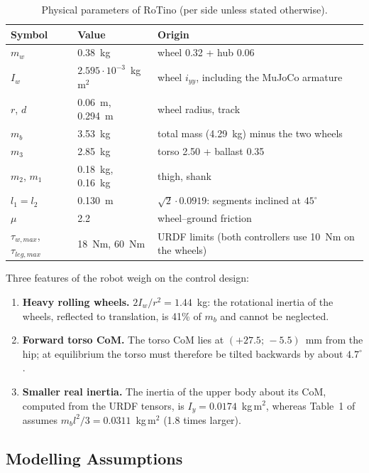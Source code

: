 \documentclass[11pt,a4paper]{article}
\newcommand{\dgr}{^{\circ}}
\begin{document}
\begin{table}[H]
    \centering
    \caption{Physical parameters of RoTino (per side unless stated otherwise).}
    \label{tab:params}
    \begin{tabular}{llp{6.3cm}}
        \toprule
        Symbol & Value & Origin \\
        \midrule
        $m_w$ & 0.38~kg & wheel 0.32 + hub 0.06 \\
        $I_w$ & $2.595\cdot10^{-3}$~kg\,m$^2$ & wheel $i_{yy}$, including the MuJoCo armature \\
        $r$, $d$ & 0.06~m, 0.294~m & wheel radius, track \\
        $m_b$ & 3.53~kg & total mass (4.29~kg) minus the two wheels \\
        $m_3$ & 2.85~kg & torso 2.50 + ballast 0.35 \\
        $m_2$, $m_1$ & 0.18~kg, 0.16~kg & thigh, shank \\
        $l_1 = l_2$ & 0.130~m & $\sqrt{2}\cdot 0.0919$: segments inclined at $45\dgr$ \\
        $\mu$ & 2.2 & wheel--ground friction \\
        $\tau_{w,max}$, $\tau_{leg,max}$ & 18~Nm, 60~Nm & URDF limits (both controllers use 10~Nm on the wheels) \\
        \bottomrule
    \end{tabular}
\end{table}

Three features of the robot weigh on the control design:
\begin{enumerate}[leftmargin=*]
    \item \textbf{Heavy rolling wheels.}  $2I_w/r^2 = 1.44$~kg: the rotational inertia of the
          wheels, reflected to translation, is 41\% of $m_b$ and cannot be neglected.
    \item \textbf{Forward torso CoM.}  The torso CoM lies at $(+27.5;\,-5.5)$~mm from the hip;
          at equilibrium the torso must therefore be tilted backwards by about $4.7\dgr$.
    \item \textbf{Smaller real inertia.}  The inertia of the upper body about its CoM, computed
          from the URDF tensors, is $I_y = 0.0174$~kg\,m$^2$, whereas Table~1 of~\cite{cui2022}
          assumes $m_b l^2/3 = 0.0311$~kg\,m$^2$ (1.8 times larger).
\end{enumerate}

\subsection{Modelling Assumptions}
\end{document}
